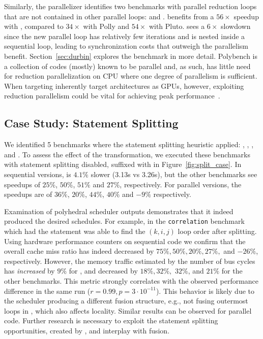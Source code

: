 Similarly, the \tool parallelizer identifies two benchmarks with parallel reduction loops that are not contained in other parallel loops:  and .  benefits from a $56\times$ speedup with \tool, compared to $34\times$ with Polly and $54\times$ with Pluto.  sees a $6\times$ slowdown since the new parallel loop has relatively few iterations and is nested inside a sequential loop, leading to synchronization costs that outweigh the parallelism benefit. Section~\ref{sec:durbin} explores the  benchmark in more detail. Polybench is a collection of codes (mostly) known to be parallel and, as such, has little need for reduction parallelization on CPU where one degree of parallelism is sufficient. When targeting inherently target architectures as GPUs, however, exploiting reduction parallelism could be vital for achieving peak performance~\cite{larsen2017strategies,reduction_drawing}.

\subsection{Case Study: Statement Splitting}\label{sec:splitcase}
We identified 5 benchmarks where the statement splitting heuristic applied: \icode{2mm}, \icode{3mm}, ,  and . To assess the effect of the transformation, we executed these benchmarks with statement splitting disabled, suffixed with  in Figure~\ref{fig:split_case}. In sequential versions, \icode{2mm} is $4.1\%$ slower (3.13s vs 3.26s), but the other benchmarks see speedups of $25\%$, $50\%$, $51\%$ and $27\%$, respectively. For parallel versions, the speedups are of $36\%$, $20\%$, $44\%$, $40\%$ and $-9\%$ respectively.

Examination of polyhedral scheduler outputs demonstrates that it indeed produced the desired schedules. For example, in the \texttt{correlation} benchmark which had the statement 
\tool was able to find the $(k, i, j)$ loop order after splitting.
Using hardware performance counters on sequential code we confirm that the overall cache miss ratio has indeed decreased by $75\%, 50\%, 20\%, 27\%,$ and $-26\%$, respectively. However, the memory traffic estimated by the number of bus cycles has \emph{increased} by $9\%$ for \icode{2mm}, and decreased by $18\%, 32\%,$ $32\%$, and $21\%$ for the other benchmarks. This metric strongly correlates with the observed performance difference in the same run ($r\!\!=\!\!0.99,  p=3\!\cdot\!10^{-11}$). This behavior is likely due to the scheduler producing a different fusion structure, e.g., not fusing outermost loops in \icode{2mm}, which also affects locality. Similar results can be observed for parallel code.  Further research is necessary to exploit the statement splitting opportunities, created by \tool, and interplay with fusion.


